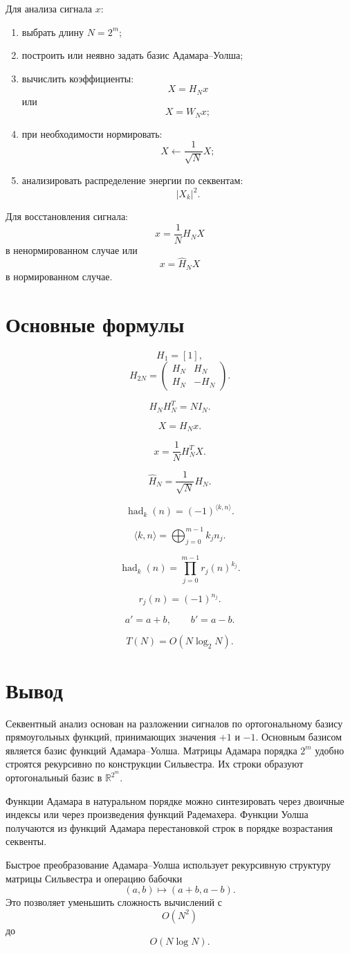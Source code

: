 \documentclass[12pt,a4paper]{article}
\begin{document}
Для анализа сигнала $x$:

\begin{enumerate}
    \item выбрать длину $N=2^m$;
    \item построить или неявно задать базис Адамара--Уолша;
    \item вычислить коэффициенты:
    \[
        X=H_Nx
    \]
    или
    \[
        X=W_Nx;
    \]
    \item при необходимости нормировать:
    \[
        X\gets \frac{1}{\sqrt{N}}X;
    \]
    \item анализировать распределение энергии по секвентам:
    \[
        |X_k|^2.
    \]
\end{enumerate}

Для восстановления сигнала:
\[
    x=\frac{1}{N}H_NX
\]
в ненормированном случае или
\[
    x=\widehat{H}_NX
\]
в нормированном случае.

\section{Основные формулы}

\[
    H_1=[1],
\]
\[
    H_{2N}=
    \begin{pmatrix}
        H_N&H_N\\
        H_N&-H_N
    \end{pmatrix}.
\]

\[
    H_NH_N^T=NI_N.
\]

\[
    X=H_Nx.
\]

\[
    x=\frac{1}{N}H_N^TX.
\]

\[
    \widehat{H}_N=\frac{1}{\sqrt{N}}H_N.
\]

\[
    \operatorname{had}_k(n)=(-1)^{\langle k,n\rangle}.
\]

\[
    \langle k,n\rangle
    =
    \bigoplus_{j=0}^{m-1}k_jn_j.
\]

\[
    \operatorname{had}_k(n)
    =
    \prod_{j=0}^{m-1}r_j(n)^{k_j}.
\]

\[
    r_j(n)=(-1)^{n_j}.
\]

\[
    a'=a+b,\qquad b'=a-b.
\]

\[
    T(N)=O(N\log_2N).
\]

\section{Вывод}

Секвентный анализ основан на разложении сигналов по ортогональному базису прямоугольных функций, принимающих значения $+1$ и $-1$. Основным базисом является базис функций Адамара--Уолша. Матрицы Адамара порядка $2^m$ удобно строятся рекурсивно по конструкции Сильвестра. Их строки образуют ортогональный базис в $\mathbb{R}^{2^m}$.

Функции Адамара в натуральном порядке можно синтезировать через двоичные индексы или через произведения функций Радемахера. Функции Уолша получаются из функций Адамара перестановкой строк в порядке возрастания секвенты.

Быстрое преобразование Адамара--Уолша использует рекурсивную структуру матрицы Сильвестра и операцию бабочки
\[
    (a,b)\mapsto(a+b,a-b).
\]
Это позволяет уменьшить сложность вычислений с
\[
    O(N^2)
\]
до
\[
    O(N\log N).
\]
\end{document}
